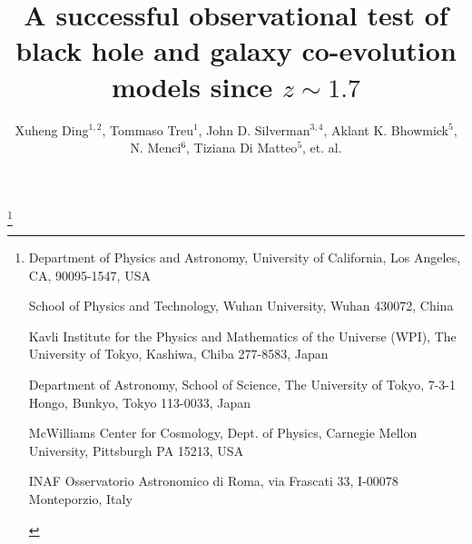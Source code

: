 \documentclass{natureprintstyle}
\title{
A successful observational test of black hole and galaxy co-evolution models since $z\sim1.7$
}
\author{Xuheng Ding$^{1,2}$, 
Tommaso Treu$^{1}$, 
John D. Silverman$^{3, 4}$,
Aklant K. Bhowmick$^{5}$,
N. Menci$^{6}$,
Tiziana Di Matteo$^{5}$,
et. al.
}
\begin{document}
\maketitle

\let\thefootnote\relax\footnote{
\begin{affiliations}
\item {Department of Physics and Astronomy, University of California, Los Angeles, CA, 90095-1547, USA} 
\item {School of Physics and Technology, Wuhan University, Wuhan 430072, China}
\item {Kavli Institute for the Physics and Mathematics of the Universe (WPI), The University of Tokyo, Kashiwa, Chiba 277-8583, Japan}
\item {Department of Astronomy, School of Science, The University of Tokyo, 7-3-1 Hongo, Bunkyo, Tokyo 113-0033, Japan}
\item{McWilliams Center for Cosmology, Dept. of Physics, Carnegie Mellon University, Pittsburgh PA 15213, USA}
\item{INAF Osservatorio Astronomico di Roma, via Frascati 33, I-00078 Monteporzio, Italy}
\end{affiliations}
}
\end{document}
